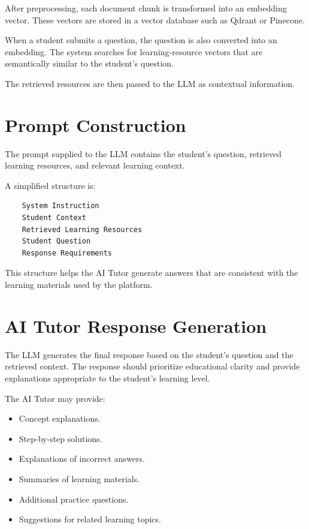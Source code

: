 \documentclass[12pt,a4paper]{report}
\begin{document}
After preprocessing, each document chunk is transformed into an
embedding vector. These vectors are stored in a vector database
such as Qdrant or Pinecone.

When a student submits a question, the question is also converted
into an embedding. The system searches for learning-resource vectors
that are semantically similar to the student's question.

The retrieved resources are then passed to the LLM as contextual
information.

\section{Prompt Construction}

The prompt supplied to the LLM contains the student's question,
retrieved learning resources, and relevant learning context.

A simplified structure is:

\begin{verbatim}
	System Instruction
	Student Context
	Retrieved Learning Resources
	Student Question
	Response Requirements
\end{verbatim}

This structure helps the AI Tutor generate answers that are
consistent with the learning materials used by the platform.

\section{AI Tutor Response Generation}

The LLM generates the final response based on the student's question
and the retrieved context. The response should prioritize
educational clarity and provide explanations appropriate to the
student's learning level.

The AI Tutor may provide:

\begin{itemize}
	\item Concept explanations.
	\item Step-by-step solutions.
	\item Explanations of incorrect answers.
	\item Summaries of learning materials.
	\item Additional practice questions.
	\item Suggestions for related learning topics.
\end{itemize}
\end{document}
